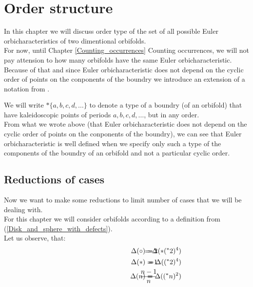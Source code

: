 \chapter{Order structure}

In this chapter we will discuss order type of the set of all possible Euler orbicharacteristics 
of two dimentional orbifolds. \\
For now, until Chapter \ref{Counting_occurrences} Counting occurrences, we will not pay attension 
to how many orbifolds have the same Euler orbicharacteristic. \\ 
Because of that and since Euler orbicharacteristic does not depend on the cyclic order 
of points on the conponents of the boundry we introduce an extension of a notation from 
\cite{Conway2008}. 


We will write $*\{a,b,c,d,\dots\}$ to denote a type of a boundry (of an orbifold) that have 
kaleidoscopic points of periods $a,b,c,d,\dots$, but in any order. \\


From what we wrote above (that Euler orbicharacteristic does not depend on the cyclic order 
of points on the conponents of the boundry), we can see that Euler 
orbicharacteristic is well defined 
when we specify only such a type of the components of the boundry of an orbifold and not 
a particular cyclic order.  \\

\section{Reductions of cases}
Now we want to make some reductions to limit number of cases that we will be dealing with. \\
For this chapter we will consider orbifolds according to a definition from 
(\ref{Disk_and_sphere_with_defects}). \\
Let us observe, that:
\begin{align*}
\hspace{3cm}\Delta(\circ) =& \hspace{-1cm} &-2& \hspace{-1cm} &= \Delta(*(^*2)^4) \\
\hspace{3cm}\Delta(*) =& \hspace{-1cm} &-1& \hspace{-1cm} &= \Delta((^*2)^4) \\
\hspace{3cm}\Delta(n) =& \hspace{-1cm} &\frac{n-1}{n}& \hspace{-1cm} &= \Delta((^*n)^2)
\end{align*}

